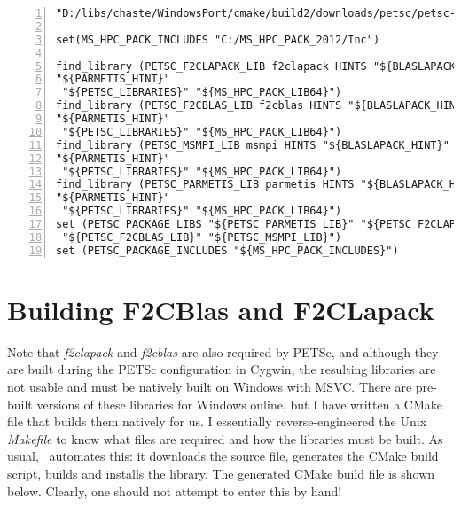 \documentclass[10pt,a4paper]{article}
\begin{document}
\begin{codeparchment}
\begin{lstlisting}[numbers=left]
"D:/libs/chaste/WindowsPort/cmake/build2/downloads/petsc/petsc-3.3-p6/WINDOWS_BUILD4/lib")

set(MS_HPC_PACK_INCLUDES "C:/MS_HPC_PACK_2012/Inc") 

find_library (PETSC_F2CLAPACK_LIB f2clapack HINTS "${BLASLAPACK_HINT}"
"${PARMETIS_HINT}"
 "${PETSC_LIBRARIES}" "${MS_HPC_PACK_LIB64}")
find_library (PETSC_F2CBLAS_LIB f2cblas HINTS "${BLASLAPACK_HINT}"
"${PARMETIS_HINT}"
 "${PETSC_LIBRARIES}" "${MS_HPC_PACK_LIB64}")
find_library (PETSC_MSMPI_LIB msmpi HINTS "${BLASLAPACK_HINT}"
"${PARMETIS_HINT}"
 "${PETSC_LIBRARIES}" "${MS_HPC_PACK_LIB64}")
find_library (PETSC_PARMETIS_LIB parmetis HINTS "${BLASLAPACK_HINT}"
"${PARMETIS_HINT}"
 "${PETSC_LIBRARIES}" "${MS_HPC_PACK_LIB64}")
set (PETSC_PACKAGE_LIBS "${PETSC_PARMETIS_LIB}" "${PETSC_F2CLAPACK_LIB}"
 "${PETSC_F2CBLAS_LIB}" "${PETSC_MSMPI_LIB}")
set (PETSC_PACKAGE_INCLUDES "${MS_HPC_PACK_INCLUDES}")
\end{lstlisting}
\end{codeparchment}


\section{Building F2CBlas and F2CLapack}
Note that \textit{f2clapack} and \textit{f2cblas} are also required by PETSc,
and although they are built during the PETSc configuration in Cygwin, the
resulting libraries are not usable and must be natively built on Windows with
MSVC. There are pre-built versions of these libraries for Windows online, but I
have written a CMake file that builds them natively for us. I essentially
reverse-engineered the Unix \textit{Makefile} to know what files are required
and how the libraries must be built. As usual, \chastelibbuilder\ automates
this: it downloads the source file, generates the CMake build script, builds and
installs the library. The generated CMake build file is shown below. Clearly,
one should not attempt to enter this by hand!
\end{document}
